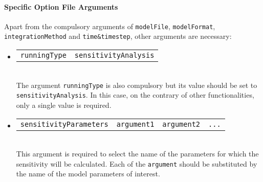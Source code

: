 \documentclass[a4paper, 11pt]{article}
\begin{document}
\paragraph{Specific Option File Arguments} \label{fileArgumentsSensitivity}
Apart from the compulsory arguments of \texttt{modelFile}, \texttt{modelFormat}, \texttt{integrationMethod} and \texttt{time\&timestep}, other arguments are necessary:
\begin{itemize}
  \item \begin{tabular}{cc}\texttt{runningType}&\texttt{sensitivityAnalysis}\end{tabular}\\[1.5ex]
    The argument \texttt{runningType} is also compulsory but its value should be set to \texttt{sensitivityAnalysis}.
    In this case, on the contrary of other functionalities, only a single value is required.
\item \begin{tabular}{cccc}\texttt{sensitivityParameters}&\texttt{argument1}&\texttt{argument2}&\texttt{...}\end{tabular}\\[1.5ex]
  This argument is required to select the name of the parameters for which the sensitivity will be calculated.
  Each of the \texttt{argument} should be substituted by the name of the model parameters of interest.
\end{itemize}
\end{document}
